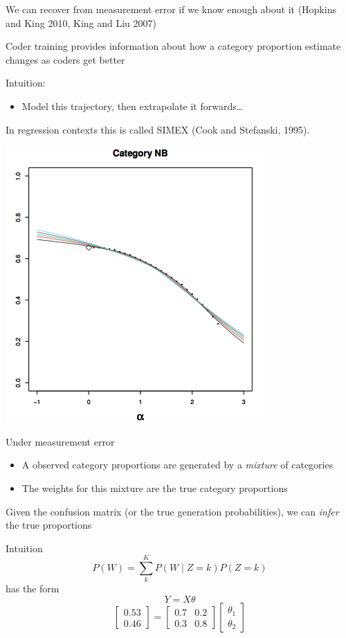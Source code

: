 \documentclass[11pt,compress,professionalfonts]{beamer}
\newcommand{\ita}{\begin{itemize}}
\newcommand{\itm}{\item[]}
\newcommand{\itz}{\end{itemize}}
\begin{document}

We can recover from measurement error if we know enough about it (Hopkins and King 2010, King and Liu 2007)

Coder training provides information about how a category proportion estimate changes as coders get better

Intuition: 
\ita
\itm Model this trajectory, then extrapolate it forwards\ldots
\itz

In regression contexts this is called SIMEX (Cook and Stefanski, 1995).


\centerline{\includegraphics[scale=.8]{pictures/simex-proportion-hopkins-king}}


Under measurement error
\ita
\itm A observed category proportions are generated by a \textit{mixture} of categories
\itm The weights for this mixture are the true category proportions
\itz
Given the confusion matrix (or the true generation probabilities), we can \textit{infer} the true proportions


Intuition
\[
{P(W)} = \sum^K_k {P(W \mid Z=k)} P(Z=k)
\]
has the form
\[
Y = X\theta
\]
\[
\left[\begin{array}{c}0.53 \\0.46\end{array}\right] = 
\left[\begin{array}{cc}0.7 & 0.2 \\0.3 & 0.8\end{array}\right] \left[\begin{array}{c}\theta_1 \\\theta_2\end{array}\right]
\]
\end{document}
